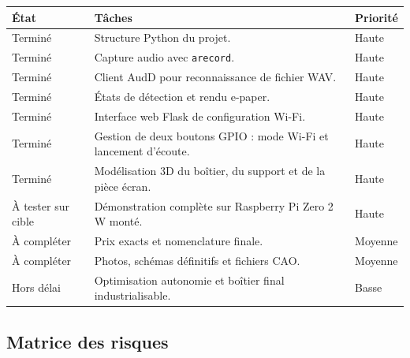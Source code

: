 \begin{longtable}{|p{3cm}|p{7cm}|p{3cm}|}
\hline
\textbf{État} & \textbf{Tâches} & \textbf{Priorité} \\
\hline
Terminé & Structure Python du projet. & Haute \\
\hline
Terminé & Capture audio avec \texttt{arecord}. & Haute \\
\hline
Terminé & Client AudD pour reconnaissance de fichier WAV. & Haute \\
\hline
Terminé & États de détection et rendu e-paper. & Haute \\
\hline
Terminé & Interface web Flask de configuration Wi-Fi. & Haute \\
\hline
Terminé & Gestion de deux boutons GPIO : mode Wi-Fi et lancement d'écoute. & Haute \\
\hline
Terminé & Modélisation 3D du boîtier, du support et de la pièce écran. & Haute \\
\hline
À tester sur cible & Démonstration complète sur Raspberry Pi Zero 2 W monté. & Haute \\
\hline
À compléter & Prix exacts et nomenclature finale. & Moyenne \\
\hline
À compléter & Photos, schémas définitifs et fichiers CAO. & Moyenne \\
\hline
Hors délai & Optimisation autonomie et boîtier final industrialisable. & Basse \\
\hline
\end{longtable}

\subsection{Matrice des risques}

